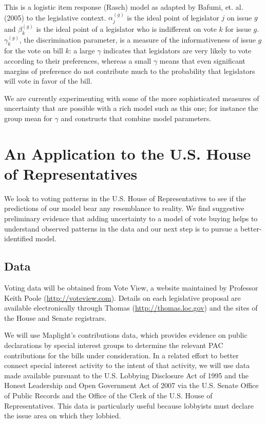 \documentclass[12pt]{article}
\newcommand{\ga}{\gamma}
\begin{document}
This is a logistic item response (Rasch) model as adapted by Bafumi, et. al. (2005) to the legislative context. $\alpha_j^{(g)}$ is the ideal point of legislator $j$ on issue $g$ and $\beta_k^{(g)}$ is the ideal point of a legislator who is indifferent on vote $k$ for issue $g$. $\gamma_k^{(g)}$, the discrimination parameter, is a measure of the informativeness of issue $g$ for the vote on bill $k$: a large $\ga$ indicates that legislators are very likely to vote according to their preferences, whereas a small $\ga$ means that even significant margins of preference do not contribute much to the probability that legislators will vote in favor of the bill.

We are currently experimenting with some of the more sophisticated measures of uncertainty that are possible with a rich model such as this one; for instance the group mean for $\ga$ and constructs that combine model parameters.


\section{An Application to the U.S. House of Representatives}
\label{sec:house}
We look to voting patterns in the U.S. House of Representatives to see if the predictions of our model bear any resemblance to reality. We find suggestive preliminary evidence that adding uncertainty to a model of vote buying helps to understand observed patterns in the data and our next step is to pursue a better-identified model.


\subsection{Data}
Voting data will be obtained from Vote View, a website maintained by Professor Keith Poole (\url{http://voteview.com}). Details on each legislative proposal are available electronically through Thomas (\url{http://thomas.loc.gov}) and the sites of the House and Senate registrars.

We will use Maplight's contributions data, which provides evidence on public declarations by special interest groups to determine the relevant PAC contributions for the bills under consideration. In a related effort to better connect special interest activity to the intent of that activity, we will use data made available pursuant to the U.S. Lobbying Disclosure Act of 1995 and the Honest Leadership and Open Government Act of 2007 via the U.S. Senate Office of Public Records and the Office of the Clerk of the U.S. House of Representatives. This data is particularly useful because lobbyists must declare the issue area on which they lobbied.
\end{document}

